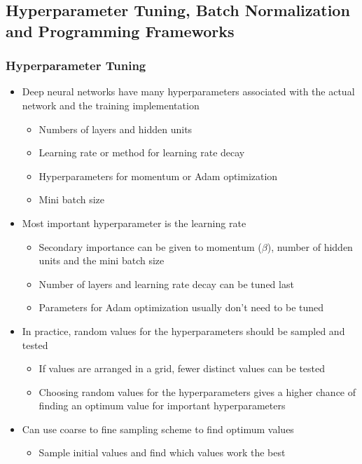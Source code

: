 \documentclass[12pt, letterpaper]{article}
\begin{document}
    \subsection{Hyperparameter Tuning, Batch Normalization and Programming Frameworks}
    \subsubsection{Hyperparameter Tuning}
    \begin{itemize}
        \item Deep neural networks have many hyperparameters associated with the actual network and the training implementation
        \begin{itemize}
            \item Numbers of layers and hidden units
            \item Learning rate or method for learning rate decay
            \item Hyperparameters for momentum or Adam optimization
            \item Mini batch size 
        \end{itemize}
        \item Most important hyperparameter is the learning rate
        \begin{itemize}
            \item Secondary importance can be given to momentum ($\beta$), number of hidden units and the mini batch size
            \item Number of layers and learning rate decay can be tuned last
            \item Parameters for Adam optimization usually don't need to be tuned
        \end{itemize}
        \item In practice, random values for the hyperparameters should be sampled and tested
        \begin{itemize}
            \item If values are arranged in a grid, fewer distinct values can be tested
            \item Choosing random values for the hyperparameters gives a higher chance of finding an optimum value for important hyperparameters
        \end{itemize}
        \item Can use coarse to fine sampling scheme to find optimum values
        \begin{itemize}
            \item Sample initial values and find which values work the best

\end{itemize}
\end{itemize}
\end{document}
